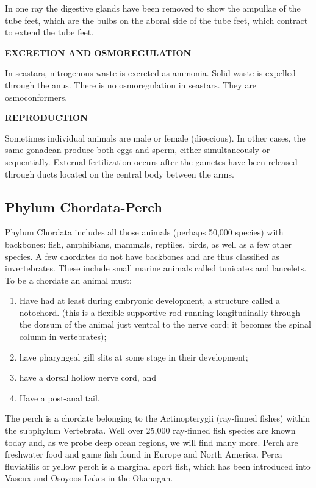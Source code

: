 \documentclass[
]{book}
\providecommand{\tightlist}{%
  \setlength{\itemsep}{0pt}\setlength{\parskip}{0pt}}
\begin{document}
In one ray the digestive glands have been removed to show the ampullae of the tube feet, which are the bulbs on the aboral side of the tube feet, which contract to extend the tube feet.

\textbf{EXCRETION AND OSMOREGULATION}

In seastars, nitrogenous waste is excreted as ammonia. Solid waste is expelled through the anus. There is no osmoregulation in seastars. They are osmoconformers.

\textbf{REPRODUCTION}

Sometimes individual animals are male or female (dioecious). In other cases, the same gonadcan produce both eggs and sperm, either simultaneously or sequentially. External fertilization occurs after the gametes have been released through ducts located on the central body between the arms.

\hypertarget{phylum-chordata-perch}{%
\subsection*{Phylum Chordata-Perch}\label{phylum-chordata-perch}}

Phylum Chordata includes all those animals (perhaps 50,000 species) with backbones: fish,
amphibians, mammals, reptiles, birds, as well as a few other species. A few chordates do not have backbones and are thus classified as invertebrates. These include small marine animals called tunicates and lancelets. To be a chordate an animal must:

\begin{enumerate}
\def\labelenumi{\arabic{enumi}.}
\tightlist
\item
  Have had at least during embryonic development, a structure called a notochord. (this is a flexible supportive rod running longitudinally through the dorsum of the animal just ventral to the nerve cord; it becomes the spinal column in vertebrates);\\
\item
  have pharyngeal gill slits at some stage in their development;
\item
  have a dorsal hollow nerve cord, and
\item
  Have a post-anal tail.
\end{enumerate}

The perch is a chordate belonging to the Actinopterygii (ray-finned fishes) within the subphylum Vertebrata. Well over 25,000 ray-finned fish species are known today and, as we probe deep ocean regions, we will find many more. Perch are freshwater food and game fish found in Europe
and North America. Perca fluviatilis or yellow perch is a marginal sport fish, which has been introduced into Vaseux and Osoyoos Lakes in the Okanagan.
\end{document}
